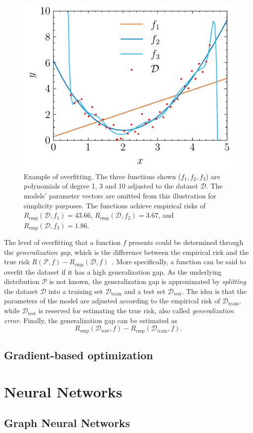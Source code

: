 \begin{figure}[h]
    \centering
    \includegraphics{pictures/overfitting.pdf}
    \caption{Example of overfitting. The three functions shown ($f_1,f_2,f_3$) are polynomials of degree 1, 3 and 10 adjusted to the dataset $\mathcal{D}$. The models' parameter vectors are omitted from this illustration for simplicity purposes. The functions achieve empirical risks of $R_\textrm{emp}(\mathcal{D},f_1)=43.66$, $R_\textrm{emp}(\mathcal{D},f_2)=3.67$, and $R_\textrm{emp}(\mathcal{D},f_3)=1.86$.}
    \label{fig:overfitting-example}
\end{figure}

The level of overfitting that a function $f$ presents could be determined through the \emph{generalization gap}, which is the difference between the empirical risk and the true risk $R(\mathcal{P},f) - R_\textrm{emp}(\mathcal{D},f)$~\cite{murphyMachineLearningProbabilistic2013}.
More specifically, a function can be said to overfit the dataset if it has a high generalization gap.
As the underlying distribution $\mathcal{P}$ is not known, the generalization gap is approximated by \emph{splitting} the dataset $\mathcal{D}$ into a training set $\mathcal{D}_\textrm{train}$ and a test set $\mathcal{D}_\textrm{test}$.
The idea is that the parameters of the model are adjusted according to the empirical risk of $\mathcal{D}_\textrm{train}$, while $\mathcal{D}_\textrm{test}$ is reserved for estimating the true risk, also called \emph{generalization error}.
Finally, the generalization gap can be estimated as  \[
    R_\textrm{emp}(\mathcal{D}_\textrm{test},f) - R_\textrm{emp}(\mathcal{D}_\textrm{train},f)
.\] 



\subsection{Gradient-based optimization}

\section{Neural Networks}

\subsection{Graph Neural Networks}


